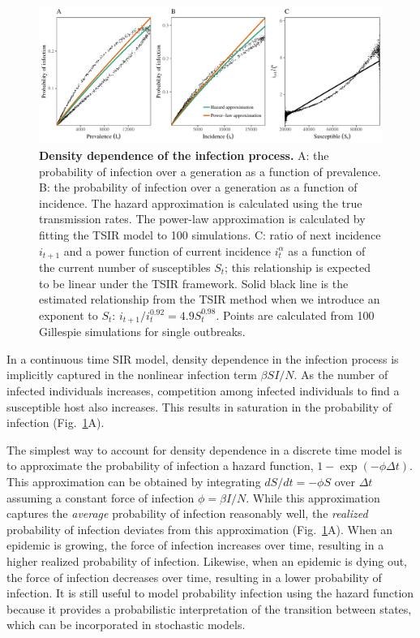 \documentclass{article}
\newcommand{\fref}[1]{Fig.~\ref{fig:#1}}
\begin{document}
\begin{figure}
\includegraphics[width=\textwidth]{../figure/tsir_poi.pdf}
\caption{
\textbf{Density dependence of the infection process.}
A: the probability of infection over a generation as a function of prevalence.
B: the probability of infection over a generation as a function of incidence.
The hazard approximation is calculated using the true transmission rates.
The power-law approximation is calculated by fitting the TSIR model to 100 simulations.
C: ratio of next incidence $i_{t+1}$ and a power function of current incidence $i_t^{\alpha}$ as a function of the current number of susceptibles $S_t$; this relationship is expected to be linear under the TSIR framework.
Solid black line is the estimated relationship from the TSIR method when we introduce an exponent to $S_t$: $i_{t+1}/i_t^{0.92} = 4.9 S_t^{0.98}$.
Points are calculated from 100 Gillespie simulations for single outbreaks.
}
\label{fig:tsirpoi}
\end{figure}

In a continuous time SIR model, density dependence in the infection process is implicitly captured in the nonlinear infection term $\beta S I/N$.
As the number of infected individuals increases, competition among infected individuals to find a susceptible host also increases. 
This results in saturation in the probability of infection (\fref{tsirpoi}A).

The simplest way to account for density dependence in a discrete time model is to approximate the probability of infection a hazard function, $1- \exp(- \phi \Delta t)$.
This approximation can be obtained by integrating $dS/dt = - \phi S$ over $\Delta t$ assuming a constant force of infection $\phi = \beta I/N$.
While this approximation captures the \emph{average} probability of infection reasonably well, the \emph{realized} probability of infection deviates from this approximation (\fref{tsirpoi}A).
When an epidemic is growing, the force of infection increases over time, resulting in a higher realized probability of infection.
Likewise, when an epidemic is dying out, the force of infection decreases over time, resulting in a lower probability of infection.
It is still useful to model probability infection using the hazard function because it provides a probabilistic interpretation of the transition between states, which can be incorporated in stochastic models. 
\end{document}
